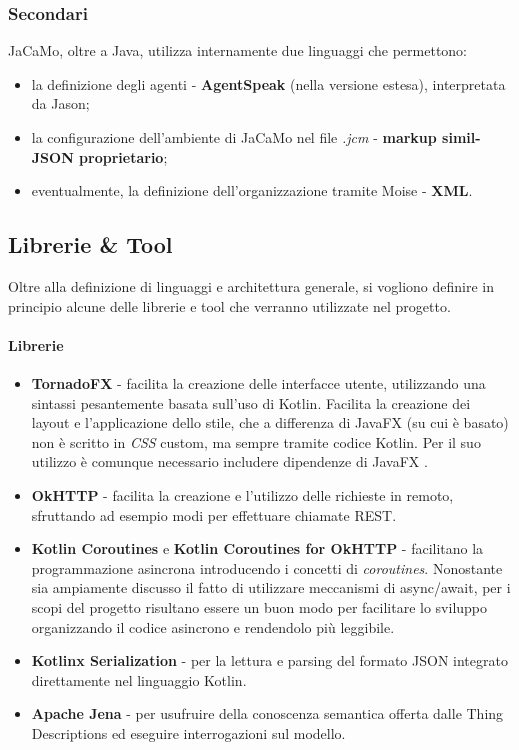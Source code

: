 \documentclass[12pt,a4paper,openright,oneside]{report}
\begin{document}
\subsubsection{Secondari}
JaCaMo, oltre a Java, utilizza internamente due linguaggi che permettono:
\begin{itemize}
	\item la definizione degli agenti - \textbf{AgentSpeak} (nella versione estesa), interpretata da Jason;
	\item la configurazione dell'ambiente di JaCaMo nel file \textit{.jcm} - \textbf{markup simil-JSON proprietario};
	\item eventualmente, la definizione dell'organizzazione tramite Moise - \textbf{XML}.
\end{itemize}


\subsection{Librerie \& Tool}
Oltre alla definizione di linguaggi e architettura generale, si vogliono definire in principio alcune delle librerie e tool che verranno utilizzate nel progetto.

\paragraph{Librerie}
\begin{itemize}
	\item \textbf{TornadoFX} \cite{tornadofx} - facilita la creazione delle interfacce utente, utilizzando una sintassi pesantemente basata sull'uso di Kotlin. Facilita la creazione dei layout e l'applicazione dello stile, che a differenza di JavaFX (su cui è basato) non è scritto in \textit{CSS} custom, ma sempre tramite codice Kotlin. Per il suo utilizzo è comunque necessario includere dipendenze di JavaFX \cite{javafx}.
	
	\item \textbf{OkHTTP} \cite{okhttp} - facilita la creazione e l'utilizzo delle richieste in remoto, sfruttando ad esempio modi per effettuare chiamate REST.
	
	\item \textbf{Kotlin Coroutines} e \textbf{Kotlin Coroutines for OkHTTP} \cite{coroutines} - facilitano la programmazione asincrona introducendo i concetti di \textit{coroutines}. Nonostante sia ampiamente discusso il fatto di utilizzare meccanismi di async/await, per i scopi del progetto risultano essere un buon modo per facilitare lo sviluppo organizzando il codice asincrono e rendendolo più leggibile. 
	
	\item \textbf{Kotlinx Serialization} \cite{coroutines} - per la lettura e parsing del formato JSON integrato direttamente nel linguaggio Kotlin.
	
	\item \textbf{Apache Jena} \cite{jena} - per usufruire della conoscenza semantica offerta dalle Thing Descriptions ed eseguire interrogazioni sul modello.
\end{itemize}
	
\end{document}
